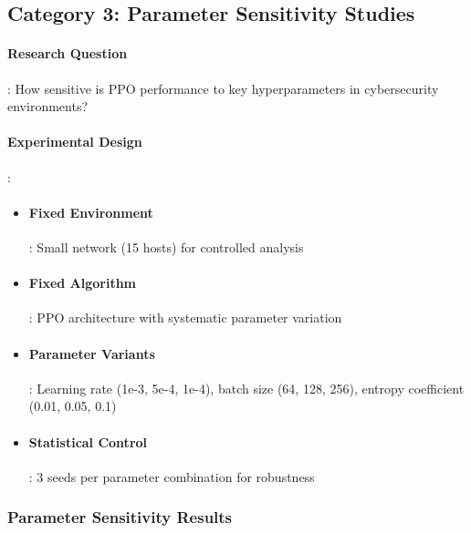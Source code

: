 \documentclass[12pt,oneside]{article}
\begin{document}
\subsection{Category 3: Parameter Sensitivity Studies}

\paragraph{Research Question}: How sensitive is PPO performance to key hyperparameters in cybersecurity environments?

\paragraph{Experimental Design}:
\begin{itemize}
\item \paragraph{Fixed Environment}: Small network (15 hosts) for controlled analysis
\item \paragraph{Fixed Algorithm}: PPO architecture with systematic parameter variation
\item \paragraph{Parameter Variants}: Learning rate (1e-3, 5e-4, 1e-4), batch size (64, 128, 256), entropy coefficient (0.01, 0.05, 0.1)
\item \paragraph{Statistical Control}: 3 seeds per parameter combination for robustness
\end{itemize}

\subsubsection{Parameter Sensitivity Results}
\end{document}
